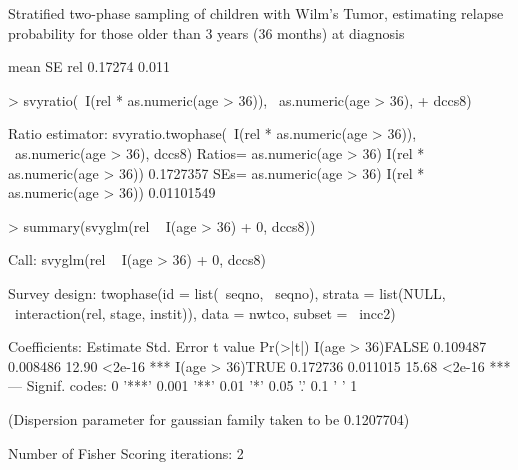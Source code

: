 \documentclass{article}
\begin{document}
Stratified two-phase sampling of children with Wilm's Tumor,
estimating relapse probability for those older than 3 years (36
months) at diagnosis
\begin{Schunk}
\begin{Soutput}
       mean    SE
rel 0.17274 0.011
\end{Soutput}
\begin{Sinput}
> svyratio(~I(rel * as.numeric(age > 36)), ~as.numeric(age > 36), 
+     dccs8)
\end{Sinput}
\begin{Soutput}
Ratio estimator: svyratio.twophase(~I(rel * as.numeric(age > 36)), ~as.numeric(age > 
    36), dccs8)
Ratios=
                              as.numeric(age > 36)
I(rel * as.numeric(age > 36))            0.1727357
SEs=
                              as.numeric(age > 36)
I(rel * as.numeric(age > 36))           0.01101549
\end{Soutput}
\begin{Sinput}
> summary(svyglm(rel ~ I(age > 36) + 0, dccs8))
\end{Sinput}
\begin{Soutput}
Call:
svyglm(rel ~ I(age > 36) + 0, dccs8)

Survey design:
twophase(id = list(~seqno, ~seqno), strata = list(NULL, ~interaction(rel, 
    stage, instit)), data = nwtco, subset = ~incc2)

Coefficients:
                 Estimate Std. Error t value Pr(>|t|)    
I(age > 36)FALSE 0.109487   0.008486   12.90   <2e-16 ***
I(age > 36)TRUE  0.172736   0.011015   15.68   <2e-16 ***
---
Signif. codes:  0 '***' 0.001 '**' 0.01 '*' 0.05 '.' 0.1 ' ' 1 

(Dispersion parameter for gaussian family taken to be 0.1207704)

Number of Fisher Scoring iterations: 2
\end{Soutput}
\end{Schunk}
\end{document}
